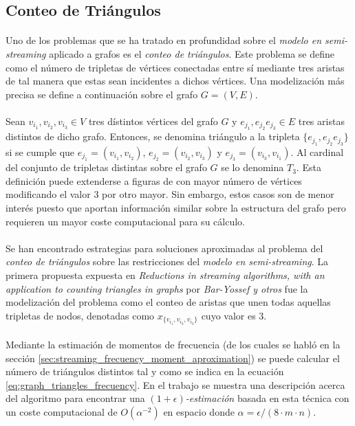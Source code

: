 \documentclass{subfiles}
\begin{document}
      \subsection{Conteo de Triángulos}
      \label{sec:counting_triangles}

        \paragraph{}
        Uno de los problemas que se ha tratado en profundidad sobre el \emph{modelo en semi-streaming} aplicado a grafos es el \emph{conteo de triángulos}. Este problema se define como el número de tripletas de vértices conectadas entre sí mediante tres aristas de tal manera que estas sean incidentes a dichos vértices. Una modelización más precisa se define a continuación sobre el grafo $G=(V,E)$.

        \paragraph{}
        Sean $v_{i_1},v_{i_2},v_{i_3} \in V$ tres dístintos vértices del grafo $G$ y $e_{j_1}, e_{j_2} e_{j_3} \in E$ tres aristas distintos de dicho grafo. Entonces, se denomina triángulo a la tripleta $\{e_{j_1}, e_{j_2} e_{j_3}\}$ si se cumple que $e_{j_1} = (v_{i_1},v_{i_2})$, $e_{j_2} = (v_{i_2},v_{i_3})$ y $e_{j_3} = (v_{i_3},v_{i_1})$. Al cardinal del conjunto de tripletas distintas sobre el grafo $G$ se lo denomina $T_3$. Esta definición puede extenderse a figuras de con mayor número de vértices modificando el valor $3$ por otro mayor. Sin embargo, estos casos son de menor interés puesto que aportan información similar sobre la estructura del grafo pero requieren un mayor coste computacional para su cálculo.

        \paragraph{}
        Se han encontrado estrategias para soluciones aproximadas al problema del \emph{conteo de triángulos} sobre las restricciones del \emph{modelo en semi-streaming}. La primera propuesta expuesta en \emph{Reductions in streaming algorithms, with an application to counting triangles in graphs} \cite{bar2002reductions} por \emph{Bar-Yossef y otros} fue la modelización del problema como el conteo de aristas que unen todas aquellas tripletas de nodos, denotadas como $x_{\{v_{i_1},v_{i_2},v_{i_3}\}}$ cuyo valor es $3$.

        \paragraph{}
        Mediante la estimación de momentos de frecuencia (de los cuales se habló en la sección \ref{sec:streaming_frecuency_moment_aproximation}) se puede calcular el número de triángulos distintos tal y como se indica en la ecuación \ref{eq:graph_triangles_frecuency}. En el trabajo \cite{bar2002reductions} se muestra una descripción acerca del algoritmo para encontrar una \emph{$(1 + \epsilon)$-estimación} basada en esta técnica con un coste computacional de $O(\alpha^{-2})$ en espacio donde $\alpha = \epsilon / (8 \cdot m \cdot n)$.
\end{document}
